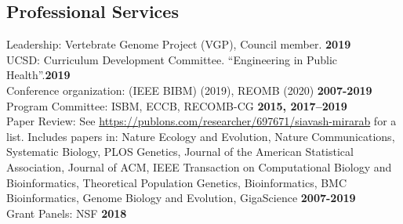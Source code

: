 \documentclass[margin,line,letterpaper]{resume}
\begin{document}
\begin{resume}
    \section{\mysidestyle Professional Services}
    Leadership: Vertebrate Genome Project (VGP), Council member.   \hfill \textbf{2019}\vspace{1mm}\\
    UCSD: Curriculum Development Committee. ``Engineering in Public Health''.\hfill \textbf{2019}\vspace{1mm} \\
     Conference organization: (IEEE BIBM) (2019), REOMB (2020)   \hfill \textbf{2007-2019}\vspace{1mm}\\
    Program Committee: ISBM, ECCB, RECOMB-CG  \hfill \textbf{2015, 2017--2019}\vspace{1mm}\\
    Paper Review:  See \url{https://publons.com/researcher/697671/siavash-mirarab} for a list.
    Includes papers in: Nature Ecology and Evolution, Nature Communications, Systematic Biology, PLOS Genetics, Journal of the American Statistical Association, Journal of ACM, IEEE Transaction on Computational Biology and Bioinformatics, Theoretical Population Genetics, Bioinformatics, BMC Bioinformatics, Genome Biology and Evolution, GigaScience    \hfill \textbf{2007-2019}\vspace{1mm}\\
Grant Panels:  NSF  \hfill \textbf{2018}


\end{resume}
\end{document}
